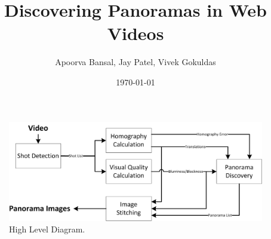 \documentclass[10pt]{article}
\author{Apoorva Bansal, Jay Patel, Vivek Gokuldas}
\title{Discovering Panoramas in Web Videos}
\date{\today}
\begin{document}
\maketitle



\begin{multicols}{2}





\end{multicols}
\begin{figure}[t] 
  \centering
  \includegraphics[scale=1.2]{HLD.png}  
  \caption{High Level Diagram.} \label{fig:HLD}
\end{figure}
\begin{multicols}{2}








\end{multicols}
\end{document}
